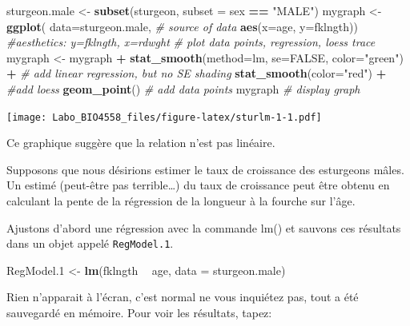 \documentclass[12pt,]{book}
\newenvironment{Shaded}{\begin{snugshade}}{\end{snugshade}}
\newcommand{\CommentTok}[1]{\textcolor[rgb]{0.56,0.35,0.01}{\textit{#1}}}
\newcommand{\DataTypeTok}[1]{\textcolor[rgb]{0.13,0.29,0.53}{#1}}
\newcommand{\FloatTok}[1]{\textcolor[rgb]{0.00,0.00,0.81}{#1}}
\newcommand{\KeywordTok}[1]{\textcolor[rgb]{0.13,0.29,0.53}{\textbf{#1}}}
\newcommand{\NormalTok}[1]{#1}
\newcommand{\OperatorTok}[1]{\textcolor[rgb]{0.81,0.36,0.00}{\textbf{#1}}}
\newcommand{\OtherTok}[1]{\textcolor[rgb]{0.56,0.35,0.01}{#1}}
\newcommand{\StringTok}[1]{\textcolor[rgb]{0.31,0.60,0.02}{#1}}
\begin{document}
\begin{Shaded}
\begin{Highlighting}[]
\NormalTok{sturgeon.male <-}\StringTok{ }\KeywordTok{subset}\NormalTok{(sturgeon, }\DataTypeTok{subset =}\NormalTok{ sex }\OperatorTok{==}\StringTok{ "MALE"}\NormalTok{)}
\NormalTok{mygraph <-}\StringTok{ }\KeywordTok{ggplot}\NormalTok{(}
  \DataTypeTok{data=}\NormalTok{sturgeon.male, }\CommentTok{# source of data}
  \KeywordTok{aes}\NormalTok{(}\DataTypeTok{x=}\NormalTok{age, }\DataTypeTok{y=}\NormalTok{fklngth)) }\CommentTok{#aesthetics: y=fklngth, x=rdwght}
\CommentTok{# plot data points, regression, loess trace}
\NormalTok{mygraph <-}\StringTok{ }\NormalTok{mygraph }\OperatorTok{+}
\StringTok{  }\KeywordTok{stat_smooth}\NormalTok{(}\DataTypeTok{method=}\NormalTok{lm, }\DataTypeTok{se=}\OtherTok{FALSE}\NormalTok{, }\DataTypeTok{color=}\StringTok{"green"}\NormalTok{) }\OperatorTok{+}\StringTok{ }\CommentTok{# add linear regression, but no SE shading}
\StringTok{  }\KeywordTok{stat_smooth}\NormalTok{(}\DataTypeTok{color=}\StringTok{"red"}\NormalTok{) }\OperatorTok{+}\StringTok{ }\CommentTok{#add loess}
\StringTok{  }\KeywordTok{geom_point}\NormalTok{() }\CommentTok{# add data points}
\NormalTok{mygraph }\CommentTok{# display graph}
\end{Highlighting}
\end{Shaded}

\texttt{[image: Labo\_BIO4558\_files/figure-latex/sturlm-1-1.pdf]}

Ce graphique suggère que la relation n'est pas linéaire.

Supposons que nous désirions estimer le taux de croissance des esturgeons mâles.
Un estimé (peut-être pas terrible\ldots{}) du taux de croissance peut être obtenu en calculant la pente de la régression de la longueur à la fourche sur l'âge.

Ajustons d'abord une régression avec la commande lm() et sauvons ces résultats dans un objet appelé \texttt{RegModel.1}.

\begin{Shaded}
\begin{Highlighting}[]
\NormalTok{RegModel}\FloatTok{.1}\NormalTok{ <-}\StringTok{ }\KeywordTok{lm}\NormalTok{(fklngth }\OperatorTok{~}\StringTok{ }\NormalTok{age, }\DataTypeTok{data =}\NormalTok{ sturgeon.male)}
\end{Highlighting}
\end{Shaded}

Rien n'apparait à l'écran, c'est normal ne vous inquiétez pas, tout a été sauvegardé en mémoire.
Pour voir les résultats, tapez:
\end{document}
